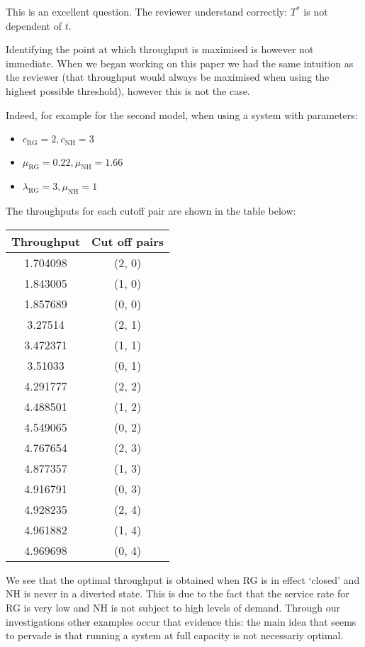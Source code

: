 \documentclass{article}
\begin{document}
This is an excellent question. The reviewer understand correctly: \(T^*\) is
not dependent of \(t\).

Identifying the point at which throughput is maximised is however not
immediate. When we began working on this paper we had the same intuition as the
reviewer (that throughput would always be maximised when using the highest
possible threshold), however this is not the case.

Indeed, for example for the second model, when using a system with parameters:

\begin{itemize}
    \item \(c_{\text{RG}}=2, c_{\text{NH}}=3\)
    \item \(\mu_{\text{RG}}=0.22, \mu_{\text{NH}}=1.66\)
    \item \(\lambda_{\text{RG}}=3, \mu_{\text{NH}}=1\)
\end{itemize}

The throughputs for each cutoff pair are shown in the table below:

\begin{center}
    \begin{tabular}{cc}
        \toprule
        Throughput & Cut off pairs\\
        \midrule
        1.704098 &(2, 0)\\
        1.843005 &(1, 0)\\
        1.857689 &(0, 0)\\
        3.27514 &(2, 1)\\
        3.472371 &(1, 1)\\
        3.51033 &(0, 1)\\
        4.291777 &(2, 2)\\
        4.488501 &(1, 2)\\
        4.549065 &(0, 2)\\
        4.767654 &(2, 3)\\
        4.877357 &(1, 3)\\
        4.916791 &(0, 3)\\
        4.928235 &(2, 4)\\
        4.961882 &(1, 4)\\
        4.969698 &(0, 4)\\
        \bottomrule
    \end{tabular}
\end{center}

We see that the optimal throughput is obtained when RG is in effect `closed'
and NH is never in a diverted state. This is due to the fact that the service
rate for RG is very low and NH is not subject to high levels of demand. Through our investigations other examples occur that evidence this: the main idea that seems to pervade is that running a system at full capacity is not necessariy optimal.
\end{document}
